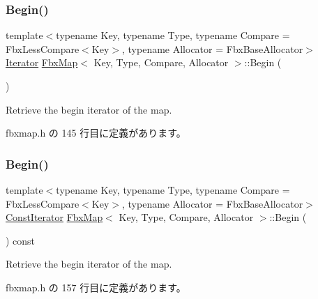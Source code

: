 \subsubsection{\texorpdfstring{Begin()}{Begin()}\hspace{0.1cm}{\footnotesize\ttfamily [1/2]}}
{\footnotesize\ttfamily template$<$typename Key, typename Type, typename Compare = Fbx\+Less\+Compare$<$\+Key$>$, typename Allocator = Fbx\+Base\+Allocator$>$ \\
\hyperlink{class_fbx_map_ab0989f3b30c0c8652ff9ee1b28b5c1af}{Iterator} \hyperlink{class_fbx_map}{Fbx\+Map}$<$ Key, Type, Compare, Allocator $>$\+::Begin (\begin{DoxyParamCaption}{ }\end{DoxyParamCaption})\hspace{0.3cm}{\ttfamily [inline]}}



Retrieve the begin iterator of the map. 



 fbxmap.\+h の 145 行目に定義があります。

\mbox{\label{class_fbx_map_af6956e55ea4b46656a9a357935d74b96}} 
\subsubsection{\texorpdfstring{Begin()}{Begin()}\hspace{0.1cm}{\footnotesize\ttfamily [2/2]}}
{\footnotesize\ttfamily template$<$typename Key, typename Type, typename Compare = Fbx\+Less\+Compare$<$\+Key$>$, typename Allocator = Fbx\+Base\+Allocator$>$ \\
\hyperlink{class_fbx_map_acf89f4bb5cf415e5e04087c2179bf367}{Const\+Iterator} \hyperlink{class_fbx_map}{Fbx\+Map}$<$ Key, Type, Compare, Allocator $>$\+::Begin (\begin{DoxyParamCaption}{ }\end{DoxyParamCaption}) const\hspace{0.3cm}{\ttfamily [inline]}}



Retrieve the begin iterator of the map. 



 fbxmap.\+h の 157 行目に定義があります。

\mbox{\label{class_fbx_map_a4d7bc86f85835f091d6623d6e358d2ca}} 

